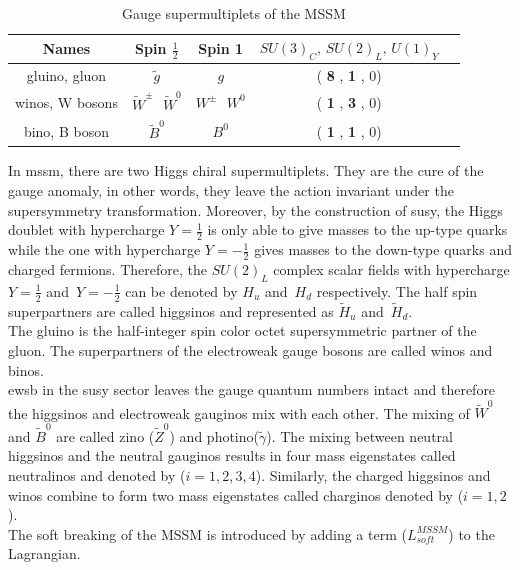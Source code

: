 \\
\begin{table}[ht]
\begin{center}
\begin{tabular}{|c|c|c|c|c|}\hline
Names    & Spin $\frac{1}{2}$    & Spin  1 & $SU(3)_C,\,SU(2)_L,\,U(1)_Y$ \\
\hline
\hline
gluino, gluon & $\tilde{g}$  &  $g$      & ( {\bf 8} , {\bf 1} , 0)\\
\hline
winos, W bosons & $\tilde{W}^{\pm}$\,\, $\tilde{W}^0$  & $ W^{\pm}$\,\, $W^0$      & ( {\bf 1} , {\bf 3} , 0) \\
\hline
bino, B boson &  $\tilde{B}^0$ &    $B^0$   & ( {\bf 1} , {\bf 1} , 0)\\
\hline
\end{tabular}
\end{center}
\caption{Gauge supermultiplets of the MSSM}\label{tab:mssmGauge}
\end{table}
\renewcommand{\arraystretch}{1}
In \acrshort{mssm}, there are two Higgs chiral supermultiplets. They are the cure of the gauge anomaly, in other words, they leave the action invariant under the supersymmetry transformation. Moreover, by the construction of \acrshort{susy}, the Higgs doublet with hypercharge $Y=\frac{1}{2}$ is only able to give masses to the up-type quarks while the one with hypercharge $Y=-\frac{1}{2}$ gives masses to the down-type quarks and charged fermions. Therefore, the $SU(2)_L$ complex scalar fields with hypercharge $Y=\frac{1}{2}$ and~$Y=-\frac{1}{2}$ can be denoted by $H_u$ and~$H_d$ respectively. The half spin superpartners are called higgsinos and represented as $\tilde{H}_u$ and~$\tilde{H}_d$.\\
The gluino is the half-integer spin color octet supersymmetric partner of the gluon. The superpartners of the electroweak gauge bosons are called winos and binos.\\
\acrshort{ewsb} in the \acrshort{susy} sector leaves the gauge quantum numbers intact and therefore the higgsinos and electroweak gauginos mix with each other. The mixing of $\tilde{W}^0$ and $\tilde{B}^0$ are called zino ($\tilde{Z}^0$) and photino($\tilde{\gamma}$). The mixing between neutral higgsinos and the neutral gauginos results in four mass eigenstates called neutralinos and denoted by \ninoi ($i = 1, 2, 3, 4$). Similarly, the charged higgsinos and winos combine to form two mass eigenstates called charginos denoted by \chipmi ($i = 1, 2$).\\
The soft breaking of the MSSM is introduced by adding a term ($L^{MSSM}_{soft}$) to the Lagrangian. %
